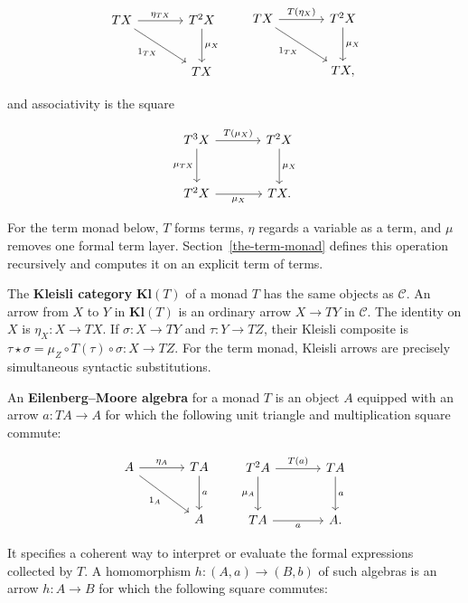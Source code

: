 \documentclass[11pt]{article}
\begin{document}
\[
\begin{tikzcd}[row sep=large,column sep=large]
T X \arrow[r,"\eta_{T X}"] \arrow[dr,"1_{T X}"'] &
T^2X \arrow[d,"\mu_X"] \\
& T X
\end{tikzcd}
\qquad
\begin{tikzcd}[row sep=large,column sep=large]
T X \arrow[r,"T(\eta_X)"] \arrow[dr,"1_{T X}"'] &
T^2X \arrow[d,"\mu_X"] \\
& T X,
\end{tikzcd}
\]

and associativity is the square

\[
\begin{tikzcd}[row sep=large,column sep=large]
T^3X \arrow[r,"T(\mu_X)"] \arrow[d,"\mu_{T X}"'] &
T^2X \arrow[d,"\mu_X"] \\
T^2X \arrow[r,"\mu_X"'] & T X.
\end{tikzcd}
\]

For the term monad below, \(T\) forms terms, \(\eta\) regards a variable as a
term, and \(\mu\) removes one formal term layer. Section~\ref{the-term-monad}
defines this operation recursively and computes it on an explicit term of
terms.

The \textbf{Kleisli category} \(\mathbf{Kl}(T)\) of a monad \(T\) has
the same objects as \(\mathcal C\). An arrow from \(X\) to \(Y\) in
\(\mathbf{Kl}(T)\) is an ordinary arrow \(X\to TY\) in \(\mathcal C\).
The identity on \(X\) is \(\eta_X:X\to TX\). If
\(\sigma:X\to TY\) and \(\tau:Y\to TZ\), their Kleisli composite is
\(\tau\star\sigma=\mu_Z\circ T(\tau)\circ\sigma:X\to TZ\). For the term
monad, Kleisli arrows are precisely simultaneous syntactic substitutions.

An \textbf{Eilenberg--Moore algebra} for a monad \(T\) is an object
\(A\) equipped with an arrow \(a:TA\to A\) for which the following unit
triangle and multiplication square commute:

\[
\begin{tikzcd}[row sep=large,column sep=large]
A \arrow[r,"\eta_A"] \arrow[dr,"1_A"'] & T A \arrow[d,"a"] \\
& A
\end{tikzcd}
\qquad
\begin{tikzcd}[row sep=large,column sep=large]
T^2A \arrow[r,"T(a)"] \arrow[d,"\mu_A"'] &
T A \arrow[d,"a"] \\
T A \arrow[r,"a"'] & A.
\end{tikzcd}
\]

It specifies a coherent way to interpret or evaluate the formal expressions
collected by \(T\). A homomorphism \(h:(A,a)\to(B,b)\) of such algebras is
an arrow \(h:A\to B\) for which the following square commutes:
\end{document}
